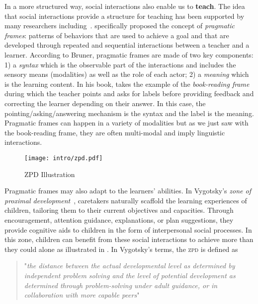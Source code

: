 In a more structured way, social interactions also enable us to \textbf{teach}. The idea that social interactions provide a structure for teaching has been supported by many researchers including~\citet{vygotsky_play_1933,bruner1985child, rohlfing_alternative_2016,vollmer2016pragmatic}. \citet{bruner1985child} specifically proposed the concept of \textit{pragmatic frames}: patterns of behaviors that are used to achieve a goal and that are developed through repeated and sequential interactions between a teacher and a learner. According to Bruner, pragmatic frames are made of two key components: 1) a \textit{syntax} which is the observable part of the interactions and includes the sensory means (modalities) as well as the role of each actor; 2) a \textit{meaning} which is the learning content. In his book, \citet{bruner1985child} takes the example of the \textit{book-reading frame} during which the teacher points and asks for labels before providing feedback and correcting the learner depending on their answer. In this case, the pointing/asking/answering mechanism is the syntax and the label is the meaning. Pragmatic frames can happen in a variety of modalities but as we just saw with the book-reading frame, they are often multi-modal and imply linguistic interactions.


\begin{wrapfigure}{r}{0.5\textwidth}
\centering
\texttt{[image: intro/zpd.pdf]}
\caption{ZPD Illustration}
\label{fig:intro_zpd}
\end{wrapfigure}
%
Pragmatic frames may also adapt to the learners' abilities. In Vygotsky's \textit{zone of proximal development}~\citep{vygotsky_thought_1934}, caretakers naturally scaffold the learning experiences of children, tailoring them to their current objectives and capacities. Through encouragement, attention guidance, explanations, or plan suggestions, they provide cognitive aids to children in the form of interpersonal social processes. In this zone, children can benefit from these social interactions to achieve more than they could alone as illustrated in . In Vygotsky's terms, the \textsc{zpd} is defined as
\begin{quote}
"\textit{the distance between the actual developmental level as determined by independent problem solving and the level of potential development as determined through problem-solving under adult guidance, or in collaboration with more capable peers}"~\citep{vygotsky_thought_1934}	
\end{quote}



